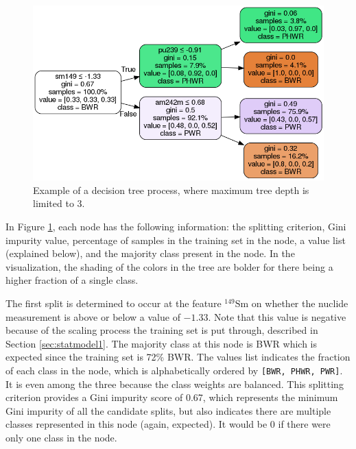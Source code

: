 \begin{figure}[!htb]
  \centering
  \includegraphics[width=\linewidth]{./chapters/litrev/dtree.png}
  \caption{Example of a decision tree process, where maximum tree depth is 
           limited to 3.}
  \label{fig:dtr}
\end{figure}

In Figure \ref{fig:dtr}, each node has the following information: the splitting
criterion, Gini impurity value, percentage of samples in the training set in
the node, a value list (explained below), and the majority class present in the
node.  In the visualization, the shading of the colors in the tree are bolder
for there being a higher fraction of a single class.

The first split is determined to occur at the feature ${}^{149}\text{Sm}$ on
whether the nuclide measurement is above or below a value of $-1.33$. Note that
this value is negative because of the scaling process the training set is put
through, described in Section \ref{sec:statmodel1}.  The majority class at this
node is \gls{BWR} which is expected since the training set is 72\% \gls{BWR}.
The values list indicates the fraction of each class in the node, which is
alphabetically ordered by \texttt{[BWR, PHWR, PWR]}. It is even among the three
because the class weights are balanced.  This splitting criterion provides a
Gini impurity score of 0.67, which represents the minimum Gini impurity of all
the candidate splits, but also indicates there are multiple classes represented
in this node (again, expected).  It would be 0 if there were only one class in
the node.  

